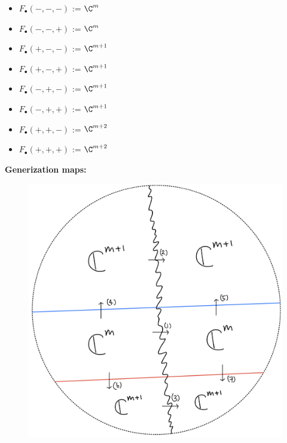 \begin{itemize}
\item $F_\bullet(-,-,-)$ := $\C^m$
\item $F_\bullet(-,-,+)$ := $\C^m$
\item $F_\bullet(+,-,-)$ := $\C^{m+1}$
\item $F_\bullet(+,-,+)$ := $\C^{m+1}$
\item $F_\bullet(-,+,-)$ := $\C^{m+1}$
\item $F_\bullet(-,+,+)$ := $\C^{m+1}$
\item $F_\bullet(+,+,-)$ := $\C^{m+2}$
\item $F_\bullet(+,+,+)$ := $\C^{m+2}$
\end{itemize}

\textbf{Generization maps:}
\begin{figure}[H]
    \centering
    \includegraphics[scale = 0.95]{diagrams/lemma1/28.png} 
    \caption{}
    \label{fig:your-label}
\end{figure}
